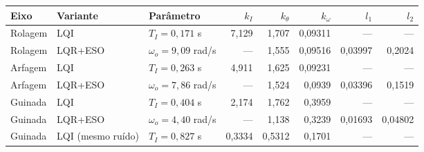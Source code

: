 \begin{tabular}{lllrrrrr}
\toprule
Eixo & Variante & Parâmetro & $k_I$ & $k_\theta$ & $k_\omega$ & $l_1$ & $l_2$ \\
\midrule
Rolagem & LQI & $T_I = 0,171$ s & 7,129 & 1,707 & 0,09311 & --- & --- \\
Rolagem & LQR+ESO & $\omega_o = 9,09$ rad/s & --- & 1,555 & 0,09516 & 0,03997 & 0,2024 \\
Arfagem & LQI & $T_I = 0,263$ s & 4,911 & 1,625 & 0,09231 & --- & --- \\
Arfagem & LQR+ESO & $\omega_o = 7,86$ rad/s & --- & 1,524 & 0,0939 & 0,03396 & 0,1519 \\
Guinada & LQI & $T_I = 0,404$ s & 2,174 & 1,762 & 0,3959 & --- & --- \\
Guinada & LQR+ESO & $\omega_o = 4,40$ rad/s & --- & 1,138 & 0,3239 & 0,01693 & 0,04802 \\
Guinada & LQI (mesmo ruído) & $T_I = 0,827$ s & 0,3334 & 0,5312 & 0,1701 & --- & --- \\
\bottomrule
\end{tabular}
